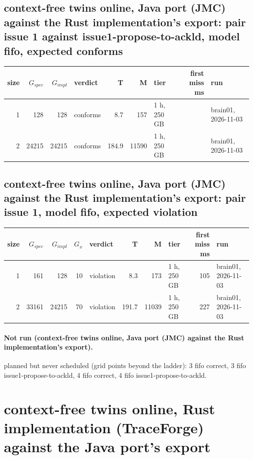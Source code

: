 \documentclass[10pt]{article}
\begin{document}
\subsection*{context-free twins online, Java port (JMC) against the Rust implementation's export: pair \textsf{issue 1} against \textsf{issue1-propose-to-ackld}, model fifo, expected conforms}
\begin{longtable}{@{}rrrlrrlrl@{}}
\toprule
size & $G_{\mathit{spec}}$ & $G_{\mathit{impl}}$ & verdict & T & M & tier & first miss ms & run \\
\midrule
\endhead
\color{blue} 1 & 128 & 128 & conforms & 8.7 & 157 & 1 h, 250 GB &  & brain01, 2026-11-03 \\
\color{blue} 2 & 24215 & 24215 & conforms & 184.9 & 11590 & 1 h, 250 GB &  & brain01, 2026-11-03 \\
\bottomrule
\end{longtable}
\subsection*{context-free twins online, Java port (JMC) against the Rust implementation's export: pair \textsf{issue 1}, model fifo, expected violation}
\begin{longtable}{@{}rrrrlrrlrl@{}}
\toprule
size & $G_{\mathit{spec}}$ & $G_{\mathit{impl}}$ & $G_x$ & verdict & T & M & tier & first miss ms & run \\
\midrule
\endhead
\color{blue} 1 & 161 & 128 & 10 & violation & 8.3 & 173 & 1 h, 250 GB & 105 & brain01, 2026-11-03 \\
\color{blue} 2 & 33161 & 24215 & 70 & violation & 191.7 & 11039 & 1 h, 250 GB & 227 & brain01, 2026-11-03 \\
\bottomrule
\end{longtable}
\paragraph{Not run (context-free twins online, Java port (JMC) against the Rust implementation's export).}
planned but never scheduled (grid points beyond the ladder): 3 fifo correct, 3 fifo issue1-propose-to-ackld, 4 fifo correct, 4 fifo issue1-propose-to-ackld.\par
\section*{context-free twins online, Rust implementation (TraceForge) against the Java port's export}
\end{document}
